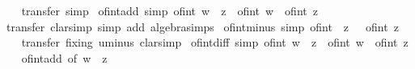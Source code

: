 \begin{isabellebody}
%
\isadelimproof
\ \ %
\endisadelimproof
%
\isatagproof
{}\isamarkupfalse%
\ transfer\ simp%
\endisatagproof
{\isafoldproof}%
%
\isadelimproof
\isanewline
%
\endisadelimproof
\isanewline
{}\isamarkupfalse%
\ of{\isacharunderscore}{\kern0pt}int{\isacharunderscore}{\kern0pt}add\ {\isacharbrackleft}{\kern0pt}simp{\isacharbrackright}{\kern0pt}{\isacharcolon}{\kern0pt}\ {\isachardoublequoteopen}of{\isacharunderscore}{\kern0pt}int\ {\isacharparenleft}{\kern0pt}w\ {\isacharplus}{\kern0pt}\ z{\isacharparenright}{\kern0pt}\ {\isacharequal}{\kern0pt}\ of{\isacharunderscore}{\kern0pt}int\ w\ {\isacharplus}{\kern0pt}\ of{\isacharunderscore}{\kern0pt}int\ z{\isachardoublequoteclose}\isanewline
%
\isadelimproof
\ \ %
\endisadelimproof
%
\isatagproof
{}\isamarkupfalse%
\ transfer\ {\isacharparenleft}{\kern0pt}clarsimp\ simp\ add{\isacharcolon}{\kern0pt}\ algebra{\isacharunderscore}{\kern0pt}simps{\isacharparenright}{\kern0pt}%
\endisatagproof
{\isafoldproof}%
%
\isadelimproof
\isanewline
%
\endisadelimproof
\isanewline
{}\isamarkupfalse%
\ of{\isacharunderscore}{\kern0pt}int{\isacharunderscore}{\kern0pt}minus\ {\isacharbrackleft}{\kern0pt}simp{\isacharbrackright}{\kern0pt}{\isacharcolon}{\kern0pt}\ {\isachardoublequoteopen}of{\isacharunderscore}{\kern0pt}int\ {\isacharparenleft}{\kern0pt}{\isacharminus}{\kern0pt}\ z{\isacharparenright}{\kern0pt}\ {\isacharequal}{\kern0pt}\ {\isacharminus}{\kern0pt}\ {\isacharparenleft}{\kern0pt}of{\isacharunderscore}{\kern0pt}int\ z{\isacharparenright}{\kern0pt}{\isachardoublequoteclose}\isanewline
%
\isadelimproof
\ \ %
\endisadelimproof
%
\isatagproof
{}\isamarkupfalse%
\ {\isacharparenleft}{\kern0pt}transfer\ fixing{\isacharcolon}{\kern0pt}\ uminus{\isacharparenright}{\kern0pt}\ clarsimp%
\endisatagproof
{\isafoldproof}%
%
\isadelimproof
\isanewline
%
\endisadelimproof
\isanewline
{}\isamarkupfalse%
\ of{\isacharunderscore}{\kern0pt}int{\isacharunderscore}{\kern0pt}diff\ {\isacharbrackleft}{\kern0pt}simp{\isacharbrackright}{\kern0pt}{\isacharcolon}{\kern0pt}\ {\isachardoublequoteopen}of{\isacharunderscore}{\kern0pt}int\ {\isacharparenleft}{\kern0pt}w\ {\isacharminus}{\kern0pt}\ z{\isacharparenright}{\kern0pt}\ {\isacharequal}{\kern0pt}\ of{\isacharunderscore}{\kern0pt}int\ w\ {\isacharminus}{\kern0pt}\ of{\isacharunderscore}{\kern0pt}int\ z{\isachardoublequoteclose}\isanewline
%
\isadelimproof
\ \ %
\endisadelimproof
%
\isatagproof
{}\isamarkupfalse%
\ of{\isacharunderscore}{\kern0pt}int{\isacharunderscore}{\kern0pt}add\ {\isacharbrackleft}{\kern0pt}of\ w\ {\isachardoublequoteopen}{\isacharminus}{\kern0pt}\ z{\isachardoublequoteclose}{\isacharbrackright}{\kern0pt}\ \isamarkupfalse%

\end{isabellebody}
